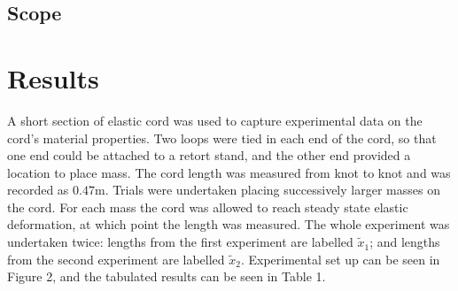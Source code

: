 \documentclass[a4paper]{article}
\begin{document}
\subsection{Scope}

\section{Results}
A short section of elastic cord was used to capture experimental data on the cord's material properties. Two loops were tied in each end of the cord, so that one end could be attached to a retort stand, and the other end provided a location to place mass. The cord length was measured from knot to knot and was recorded as $0.47\si{\meter}$. Trials were undertaken placing successively larger masses on the cord. For each mass the cord was allowed to reach steady state elastic deformation, at which point the length was measured. The whole experiment was undertaken twice: lengths from the first experiment are labelled $\tilde{x}_1$; and lengths from the second experiment are labelled $\tilde{x}_2$. Experimental set up can be seen in Figure 2, and the tabulated results can be seen in Table 1.
\end{document}
